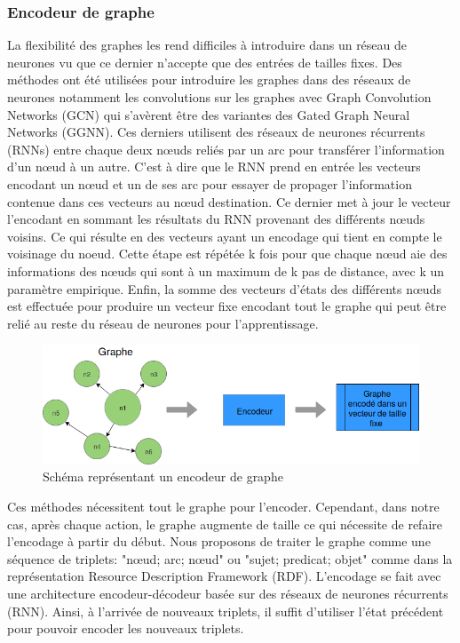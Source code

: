 \subsubsection*{Encodeur de graphe}
La flexibilité des graphes les rend difficiles à introduire dans un réseau de neurones vu que ce dernier n'accepte que des entrées de tailles fixes. Des méthodes ont été utilisées pour introduire les graphes dans des réseaux de neurones notamment les convolutions sur les graphes avec Graph Convolution Networks (GCN)\cite{KipfW17} qui s'avèrent être des variantes des Gated Graph Neural Networks (GGNN)\cite{Li2016GatedGS}. Ces derniers utilisent des réseaux de neurones récurrents (RNNs) entre chaque deux n\oe{}uds reliés par un arc pour transférer l'information d'un n\oe{}ud à un autre. C'est à dire que le RNN prend en entrée les vecteurs encodant un n\oe{}ud et un de ses arc pour essayer de propager l'information contenue dans ces vecteurs au n\oe{}ud destination. Ce dernier met à jour le vecteur l'encodant en sommant les résultats du RNN provenant des différents n\oe{}uds voisins. Ce qui résulte en des vecteurs ayant un encodage qui tient en compte le voisinage du noeud. Cette étape est répétée k fois pour que chaque n\oe{}ud aie des informations des n\oe{}uds qui sont à un maximum de k pas de distance, avec k un paramètre empirique. Enfin, la somme des vecteurs d'états des différents n\oe{}uds est effectuée pour produire un vecteur fixe encodant tout le graphe qui peut être relié au reste du réseau de neurones pour l'apprentissage.
\begin{figure}[H] 
	\centering
	\includegraphics[width=0.9\linewidth]{images/Conception/DM/encoder.png}
	\caption{Schéma représentant un encodeur de graphe}
	
\end{figure}\label{encoder}
Ces méthodes nécessitent tout le graphe pour l'encoder. Cependant, dans notre cas, après chaque action, le graphe augmente de taille ce qui nécessite de refaire l'encodage à partir du début. Nous proposons de traiter le graphe comme une séquence de triplets: "n\oe{}ud; arc; n\oe{}ud" ou "sujet; predicat; objet" comme dans la représentation Resource Description Framework (RDF). L'encodage se fait avec une architecture encodeur-décodeur basée sur des réseaux de neurones récurrents (RNN). Ainsi, à l'arrivée de nouveaux triplets, il suffit d'utiliser l'état précédent pour pouvoir encoder les nouveaux triplets.
